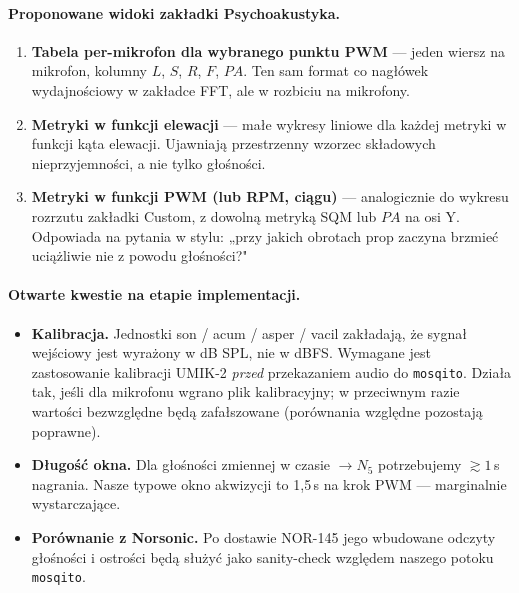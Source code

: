 \documentclass[11pt,a4paper]{article}
\begin{document}
\paragraph{Proponowane widoki zakładki Psychoakustyka.}
\begin{enumerate}
  \item \textbf{Tabela per-mikrofon dla wybranego punktu PWM} --- jeden wiersz
        na mikrofon, kolumny $L$, $S$, $R$, $F$, $PA$. Ten sam format co
        nagłówek wydajnościowy w zakładce FFT, ale w rozbiciu na mikrofony.
  \item \textbf{Metryki w funkcji elewacji} --- małe wykresy liniowe dla
        każdej metryki w funkcji kąta elewacji. Ujawniają przestrzenny
        wzorzec składowych nieprzyjemności, a nie tylko głośności.
  \item \textbf{Metryki w funkcji PWM (lub RPM, ciągu)} --- analogicznie do
        wykresu rozrzutu zakładki Custom, z dowolną metryką SQM lub $PA$
        na osi Y. Odpowiada na pytania w stylu: „przy jakich obrotach prop
        zaczyna brzmieć uciążliwie nie z powodu głośności?"
\end{enumerate}

\paragraph{Otwarte kwestie na etapie implementacji.}
\begin{itemize}
  \item \textbf{Kalibracja.} Jednostki son / acum / asper / vacil zakładają,
        że sygnał wejściowy jest wyrażony w dB SPL, nie w dBFS. Wymagane
        jest zastosowanie kalibracji UMIK-2 \emph{przed} przekazaniem audio
        do \texttt{mosqito}. Działa tak, jeśli dla mikrofonu wgrano plik
        kalibracyjny; w przeciwnym razie wartości bezwzględne będą
        zafałszowane (porównania względne pozostają poprawne).
  \item \textbf{Długość okna.} Dla głośności zmiennej w czasie $\to N_5$
        potrzebujemy $\gtrsim 1$\,s nagrania. Nasze typowe okno akwizycji
        to 1{,}5\,s na krok PWM --- marginalnie wystarczające.
  \item \textbf{Porównanie z Norsonic.} Po dostawie NOR-145 jego wbudowane
        odczyty głośności i ostrości będą służyć jako sanity-check
        względem naszego potoku \texttt{mosqito}.
\end{itemize}
\end{document}
